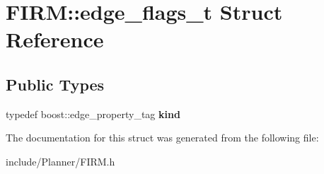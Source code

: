\hypertarget{struct_f_i_r_m_1_1edge__flags__t}{\section{\-F\-I\-R\-M\-:\-:edge\-\_\-flags\-\_\-t \-Struct \-Reference}
\label{struct_f_i_r_m_1_1edge__flags__t}
}
\subsection*{\-Public \-Types}
\begin{DoxyCompactItemize}
\item 
\hypertarget{struct_f_i_r_m_1_1edge__flags__t_a37a098e50779a7a6772be2ffa85502d4}{typedef boost\-::edge\-\_\-property\-\_\-tag {\bfseries kind}}\label{struct_f_i_r_m_1_1edge__flags__t_a37a098e50779a7a6772be2ffa85502d4}

\end{DoxyCompactItemize}


\-The documentation for this struct was generated from the following file\-:\begin{DoxyCompactItemize}
\item 
include/\-Planner/\-F\-I\-R\-M.\-h\end{DoxyCompactItemize}
